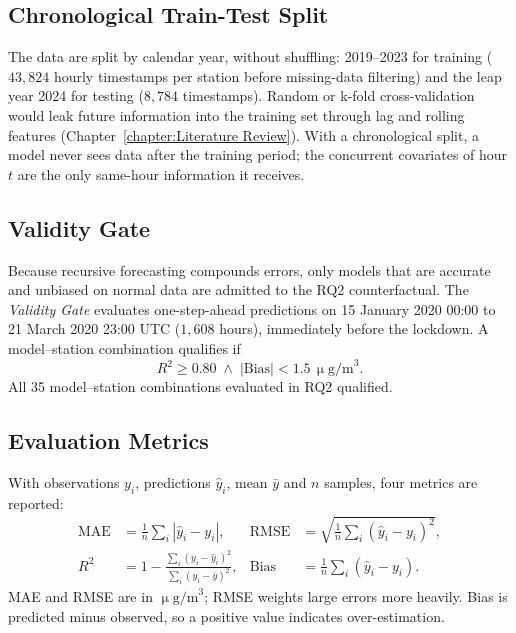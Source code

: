 \subsection{Chronological Train-Test Split}
\label{subsection:train-test}
The data are split by calendar year, without shuffling: 2019--2023 for training ($43{,}824$ hourly timestamps per station before missing-data filtering) and the leap year 2024 for testing ($8{,}784$ timestamps). Random or k-fold cross-validation would leak future information into the training set through lag and rolling features (Chapter~\ref{chapter:Literature Review}). With a chronological split, a model never sees data after the training period; the concurrent covariates of hour $t$ are the only same-hour information it receives.

\subsection{Validity Gate}
\label{subsection:validity-gate}
Because recursive forecasting compounds errors, only models that are accurate and unbiased on normal data are admitted to the RQ2 counterfactual. The \textit{Validity Gate} evaluates one-step-ahead predictions on 15 January 2020 00:00 to 21 March 2020 23:00 UTC ($1{,}608$ hours), immediately before the lockdown. A model--station combination qualifies if
\begin{equation}
    R^2 \ge 0.80 \;\land\; |\text{Bias}| < 1.5\,\upmu\text{g/m}^3 .
\end{equation}
All 35 model--station combinations evaluated in RQ2 qualified.

\subsection{Evaluation Metrics}
\label{subsection:evaluation-metrics}
With observations $y_i$, predictions $\hat{y}_i$, mean $\bar{y}$ and $n$ samples, four metrics are reported:
\begin{align}
    \text{MAE} &= \tfrac{1}{n}\textstyle\sum_{i}|\hat{y}_i - y_i|, &
    \text{RMSE} &= \sqrt{\tfrac{1}{n}\textstyle\sum_{i}(\hat{y}_i - y_i)^2}, \\
    R^2 &= 1 - \frac{\sum_{i}(y_i - \hat{y}_i)^2}{\sum_{i}(y_i - \bar{y})^2}, &
    \text{Bias} &= \tfrac{1}{n}\textstyle\sum_{i}(\hat{y}_i - y_i).
\end{align}
MAE and RMSE are in $\upmu\text{g/m}^3$; RMSE weights large errors more heavily. Bias is predicted minus observed, so a positive value indicates over-estimation.

